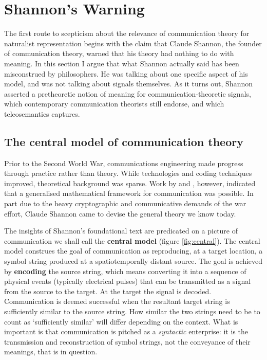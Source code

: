 
\section{Shannon's Warning}\label{sec:warning}

The first route to scepticism about the relevance of communication theory for naturalist representation begins with the claim that Claude Shannon, the founder of communication theory, warned that his theory had nothing to do with meaning.
In this section I argue that what Shannon actually said has been misconstrued by philosophers.
He was talking about one specific aspect of his model, and was not talking about signals themselves.
As it turns out, Shannon asserted a pretheoretic notion of meaning for communication-theoretic signals, which contemporary communication theorists still endorse, and which teleosemantics captures.

\subsection{The central model of communication theory}\label{subsec:central}

Prior to the Second World War, communications engineering made progress through practice rather than theory.
While technologies and coding techniques improved, theoretical background was sparse.
Work by \citet{nyquist1924certain} and \citet{hartley1928transmission}, however, indicated that a generalised mathematical framework for communication was possible.
In part due to the heavy cryptographic and communicative demands of the war effort, Claude Shannon came to devise the general theory we know today.

The insights of Shannon's foundational text \parencite*{shannon1948mathematicalc} are predicated on a picture of communication we shall call the \textbf{central model} (figure \ref{fig:central}).
The central model construes the goal of communication as reproducing, at a target location, a symbol string produced at a spatiotemporally distant source.
The goal is achieved by \textbf{encoding} the source string, which means converting it into a sequence of physical events (typically electrical pulses) that can be transmitted as a signal from the source to the target.
At the target the signal is decoded.
Communication is deemed successful when the resultant target string is sufficiently similar to the source string.
How similar the two strings need to be to count as `sufficiently similar' will differ depending on the context.
What is important is that communication is pitched as a \textit{syntactic} enterprise: it is the transmission and reconstruction of symbol strings, not the conveyance of their meanings, that is in question.

